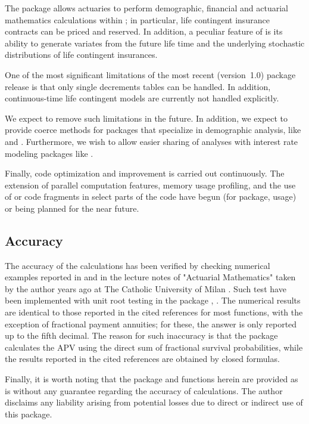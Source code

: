 \documentclass[nojss]{jss}
\begin{document}
The  package allows actuaries to perform
demographic, financial and actuarial mathematics calculations within
; in particular, life contingent insurance contracts can
be priced and reserved. In addition, a peculiar feature of
 is its ability to generate variates from the
future life time and the underlying stochastic distributions of life
contingent insurances.

One of the most significant limitations of the most recent
(version~1.0)  package release is that only
single decrements tables can be handled.  In addition, continuous-time
life contingent models are currently not handled explicitly.

We expect to remove such limitations in the future. In addition, we
expect to provide coerce methods for packages that specialize in
demographic analysis, like  and
. Furthermore, we wish to allow easier sharing of
analyses with interest rate modeling packages like .

Finally, code optimization and improvement is carried out
continuously. The extension of parallel computation features, memory
usage profiling, and the use of  or  code
fragments in select parts of the code have begun (for  package, \cite{RcppR} usage) or being 
planned for the near future.

\subsection{Accuracy}\label{sec:disclaimer}

The accuracy of the calculations has been verified by checking
numerical examples reported in \cite{bowers1997actuarial} and in the
lecture notes of "Actuarial Mathematics" taken by the author years
ago at The Catholic University of Milan \citep{mazzoleni2000appunti}. Such test have been implemented with unit root testing in the package , \cite{pkg:testthat}.
The numerical results are identical to those reported in the cited
references for most functions, with the exception of fractional
payment annuities; for these, the answer is only reported up to the
fifth decimal. The reason for such inaccuracy is that the package
calculates the APV using the direct sum of fractional survival
probabilities, while the results reported in the cited references are
obtained by closed formulas.

Finally, it is worth noting that the package and functions herein are
provided as is without any guarantee regarding the accuracy of
calculations. The author disclaims any liability arising from
potential losses due to direct or indirect use of this package.
\end{document}
